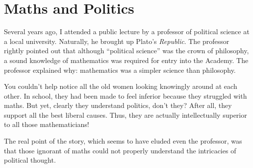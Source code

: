 \section{Maths and Politics}

Several years ago, I attended a public lecture by a professor of political science at a local university. Naturally, he brought up Plato's \textit{Republic}. The professor rightly pointed out that although ``political science'' was the crown of philosophy, a sound knowledge of mathematics was required for entry into the Academy. The professor explained why: mathematics was a simpler science than philosophy.

You couldn't help notice all the old women looking knowingly around at each other. In school, they had been made to feel inferior because they struggled with maths. But yet, clearly they understand politics, don't they? After all, they support all the best liberal causes. Thus, they are actually intellectually superior to all those mathematicians!

The real point of the story, which seems to have eluded even the professor, was that those ignorant of maths could not properly understand the intricacies of political thought.




